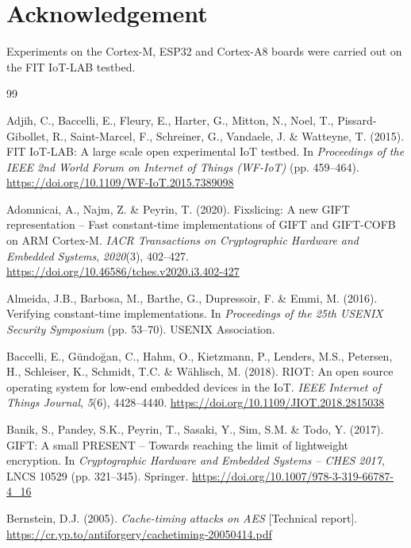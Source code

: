 \documentclass[11pt, a4paper, twoside, reqno]{article}
\begin{document}
\section{Acknowledgement}
Experiments on the Cortex-M, ESP32 and Cortex-A8 boards were carried out on the FIT IoT-LAB testbed.

\bigskip

\begin{thebibliography}{99}

Adjih, C., Baccelli, E., Fleury, E., Harter, G., Mitton, N., Noel, T., Pissard-Gibollet, R., Saint-Marcel, F., Schreiner, G., Vandaele, J. \& Watteyne, T. (2015). FIT IoT-LAB: A large scale open experimental IoT testbed. In \emph{Proceedings of the IEEE 2nd World Forum on Internet of Things (WF-IoT)} (pp. 459--464). \url{https://doi.org/10.1109/WF-IoT.2015.7389098}

Adomnicai, A., Najm, Z. \& Peyrin, T. (2020). Fixslicing: A new GIFT representation -- Fast constant-time implementations of GIFT and GIFT-COFB on ARM Cortex-M. \emph{IACR Transactions on Cryptographic Hardware and Embedded Systems}, \emph{2020}(3), 402--427. \url{https://doi.org/10.46586/tches.v2020.i3.402-427}

Almeida, J.B., Barbosa, M., Barthe, G., Dupressoir, F. \& Emmi, M. (2016). Verifying constant-time implementations. In \emph{Proceedings of the 25th USENIX Security Symposium} (pp. 53--70). USENIX Association.

Baccelli, E., G\"undo\u{g}an, C., Hahm, O., Kietzmann, P., Lenders, M.S., Petersen, H., Schleiser, K., Schmidt, T.C. \& W\"ahlisch, M. (2018). RIOT: An open source operating system for low-end embedded devices in the IoT. \emph{IEEE Internet of Things Journal}, \emph{5}(6), 4428--4440. \url{https://doi.org/10.1109/JIOT.2018.2815038}

Banik, S., Pandey, S.K., Peyrin, T., Sasaki, Y., Sim, S.M. \& Todo, Y. (2017). GIFT: A small PRESENT -- Towards reaching the limit of lightweight encryption. In \emph{Cryptographic Hardware and Embedded Systems -- CHES 2017}, LNCS 10529 (pp. 321--345). Springer. \url{https://doi.org/10.1007/978-3-319-66787-4_16}

Bernstein, D.J. (2005). \emph{Cache-timing attacks on AES} [Technical report]. \url{https://cr.yp.to/antiforgery/cachetiming-20050414.pdf}


\end{thebibliography}
\end{document}
